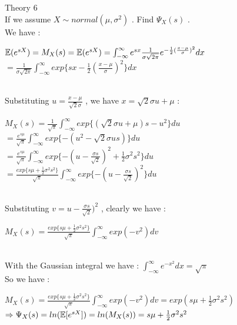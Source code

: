 \documentclass[30pt]{article}
\begin{document}
{\Large \color{blue} Theory 6 }  \vspace{0.2cm} \\
{\color{blue}{\large 1.} If we assume $X \sim normal(\mu,\sigma^2) $ . Find $\Psi_X(s) $ . } \\
We have : \\
\begin{center}
    $\Bbb{E}(e^{sX}) = M_X(s) = \Bbb{E}(e^{sX}) = \int_{-\infty}^{\infty}e^{sx}\frac{1}{\sigma\sqrt{2\pi}}e^{-\frac{1}{2}(\frac{x-\mu}{\sigma})^2}dx $ \vspace{0.25cm} \\
    $= \frac{1}{\sigma\sqrt{2\pi}}\int_{-\infty}^{\infty}exp\{sx-\frac{1}{2}(\frac{x-\mu}{\sigma})^2\} dx $
\end{center}  \vspace{0.25cm} \\
Substituting $u = \frac{x - \mu}{\sqrt{2}\sigma} $ , we have $ x = \sqrt{2}\sigma u +\mu $ : \\
\begin{center}
    $M_X(s) = \frac{1}{\sqrt{\pi}} \int_{-\infty}^{\infty}exp\{(\sqrt{2}\sigma u +\mu)s - u^2 \} du $\vspace{0.25cm} \\
    $= \frac{e^{s\mu}}{\sqrt{\pi}} \int_{-\infty}^{\infty}exp\{- (u^2 - \sqrt{2}\sigma us )\} du $ \vspace{0.25cm} \\
    $= \frac{e^{s\mu}}{\sqrt{\pi}} \int_{-\infty}^{\infty}exp\{- (u - \frac{\sigma s}{\sqrt{2}})^2 + \frac{1}{2}\sigma^2s^2  \} du $ \vspace{0.25cm} \\
    $= \frac{exp\{s\mu + \frac{1}{2}\sigma^2s^2\}}{\sqrt{\pi}} \int_{-\infty}^{\infty}exp\{- (u - \frac{\sigma s}{\sqrt{2}})^2 \} du $
\end{center} \vspace{0.25cm} \\
Substituting $ v = u - \frac{\sigma s}{\sqrt{2}})^2 $ , clearly we have : \\
\begin{center}
    $M_X(s) = \frac{exp\{s\mu + \frac{1}{2}\sigma^2s^2\}}{\sqrt{\pi}} \int_{-\infty}^{\infty}exp(-v^2) dv $
\end{center} \vspace{0.25cm} \\
With the Gaussian integral we have : \hspace{1cm} $\int_{-\infty}^{\infty}e^{-x^2}dx = \sqrt{\pi} $ \vspace{0.25cm} \\
So we have : \\
\begin{center}
    $M_X(s) = \frac{exp\{s\mu + \frac{1}{2}\sigma^2s^2\}}{\sqrt{\pi}} \int_{-\infty}^{\infty}exp(-v^2) dv  = exp(s\mu + \frac{1}{2}\sigma^2s^2) $ \vspace{0.25cm} \\
    $\Rightarrow \Psi_X(s) = ln(\Bbb{E}[e^{sX}]) = ln(M_X(s)) = s\mu + \frac{1}{2}\sigma^2s^2 $
\end{center}
\end{document}
